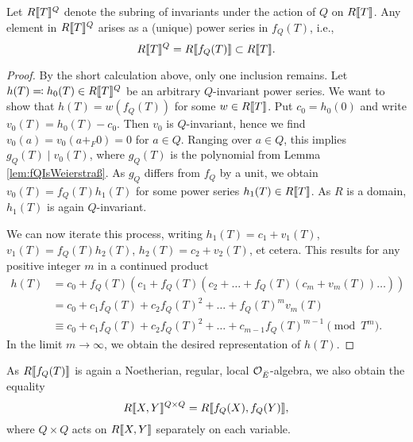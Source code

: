 \documentclass[../main.tex]{subfiles}
\begin{document}
\begin{prop}\label{prop:DescriptionOfInvariantsUnderQAction}
  Let $R\llbracket T \rrbracket^Q$ denote the subring of invariants under the action of 
  $Q$ on $R\llbracket T \rrbracket$. Any element in $R\llbracket T \rrbracket^Q$ arises as a 
  (unique) power series in $f_Q(T)$, i.e.,
  \begin{equation*}
    R\llbracket T \rrbracket^Q = R\llbracket f_Q(T) \rrbracket \subset R\llbracket T \rrbracket.
  \end{equation*}
\end{prop}
\begin{proof}
  By the short calculation above, only one inclusion remains. Let $h(T) \eqcolon
  h_0(T) \in R\llbracket T \rrbracket^Q$ be an arbitrary $Q$-invariant power series. We want
  to show that $h(T) = w(f_Q(T))$ for some $w \in R\llbracket T \rrbracket$. Put 
  $c_0 = h_0(0)$ and write $v_0(T) = h_0(T) - c_0$. Then $v_0$ is $Q$-invariant,
  hence we find $v_0(a) = v_0(a +_F 0) = 0$ for $a \in Q$. 
  Ranging over $a \in Q$, this implies $g_Q(T) \mid v_0(T)$, where $g_Q(T)$ is
  the polynomial from Lemma \ref{lem:fQIsWeierstraß}. As $g_Q$ differs from
  $f_Q$ by a unit, we obtain $v_0(T) = f_Q(T) h_1(T)$ for some power series
  $h_1(T) \in R\llbracket T \rrbracket$. As $R$ is a domain, $h_1(T)$ is again
  $Q$-invariant.

  We can now iterate this process, writing $h_1(T) = c_1 + v_1(T)$, 
  $v_1(T) = f_Q(T) h_2(T)$, $h_2(T) = c_2 + v_2(T)$, et cetera. This results
  for any positive integer $m$ in a continued product
  \begin{align*}
    h(T) &= c_0 + f_Q(T) (c_1 + f_Q(T)(c_2 + \dots + f_Q(T)(c_m + v_m(T)) \dots ))\\
         &= c_0 + c_1 f_Q(T) + c_2f_Q(T)^2 + \dots + f_Q(T)^m v_m(T)\\
         &\equiv c_0 + c_1 f_Q(T) + c_2f_Q(T)^2 + \dots + c_{m-1}f_Q(T)^{m-1}
         \pmod {T^m}.
  \end{align*}
  In the limit $m\to \infty$, we obtain the desired representation of $h(T)$.
\end{proof}

As $R\llbracket f_Q(T) \rrbracket$ is again a Noetherian, regular, local 
$\mathcal{O}_{\breve {E}}$-algebra, we also obtain the equality
\begin{equation*}
  R\llbracket X,Y \rrbracket^{Q \times Q} = R\llbracket f_Q(X), f_Q(Y) \rrbracket,
\end{equation*}
where $Q\times Q$ acts on $R\llbracket X,Y \rrbracket$ separately on each variable.
\end{document}
